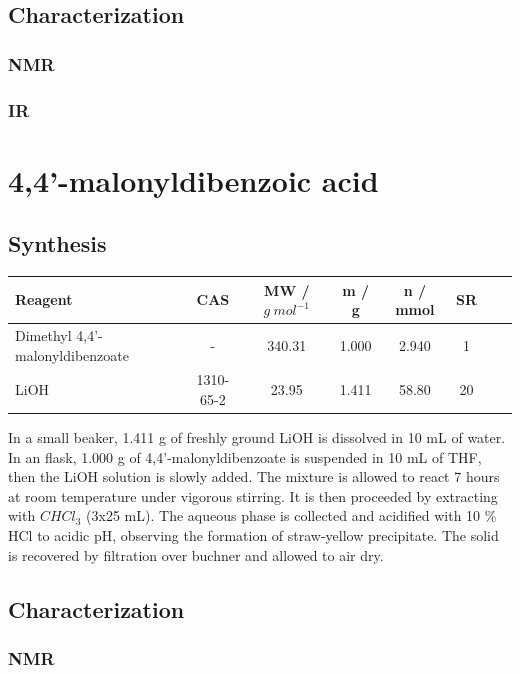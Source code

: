\documentclass[../Master.tex]{subfiles}
\begin{document}
\subsection{Characterization}
\subsubsection{NMR}
\subsubsection{IR}
\section{4,4'-malonyldibenzoic acid}
\subsection{Synthesis}

\begin{center}
	\begin{tabular}[b]{lccccccc}
		\toprule
		Reagent                         & CAS       & MW / \(g \ mol^{-1}\) & m / g & n / mmol & SR \\
		\midrule
		Dimethyl 4,4'-malonyldibenzoate & -         & 340.31                & 1.000 & 2.940    & 1  \\
		LiOH                            & 1310-65-2 & 23.95                 & 1.411 & 58.80    & 20 \\
		\bottomrule
	\end{tabular}
\end{center}

In a small beaker, 1.411 g of freshly ground LiOH is dissolved in 10 mL of water. In an flask, 1.000 g of 4,4'-malonyldibenzoate is suspended in 10 mL of THF, then the LiOH solution is slowly added. The mixture is allowed to react 7 hours at room temperature under vigorous stirring. It is then proceeded by extracting with \(CHCl_{3}\) (3x25 mL). The aqueous phase is collected and acidified with 10 \% HCl to acidic pH, observing the formation of straw-yellow precipitate. The solid is recovered by filtration over buchner and allowed to air dry.

\subsection{Characterization}
\subsubsection{NMR}
\end{document}
